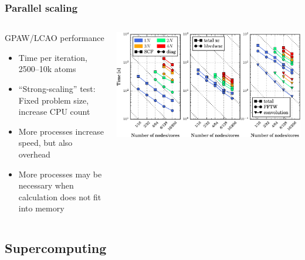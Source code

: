 \documentclass[usenames,dvipsnames,mathserif,compress]{beamer}
\begin{document}
\begin{frame}
  \frametitle{Parallel scaling}
  \begin{columns}
    \begin{column}{0.67\textwidth}
        \begin{block}{GPAW/LCAO performance}
      \begin{itemize}
      \item Time per iteration, 2500--10k atoms
      \item ``Strong-scaling'' test: Fixed problem size, increase CPU count
      \item More processes increase speed, but also overhead
      \item More processes may be necessary when calculation does not fit into memory
      \end{itemize}
        \end{block}
    \end{column}
    \begin{column}{.4\textwidth}
      \includegraphics[scale=0.85]{lcao-scaling-crop.pdf}
    \end{column}
  \end{columns}
\end{frame}


\subsection*{Supercomputing}

\end{document}

